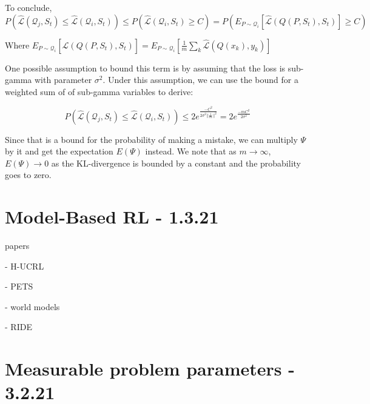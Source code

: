 \documentclass[letterpaper]{article}
\theoremstyle{definition}
\begin{document}
To conclude,
$P\left (\hat{\mathcal{L}}(\mathcal{Q}_j, S_t)\leq \hat{\mathcal{L}}(\mathcal{Q}_i, S_t)\right )\leq P\left (\hat{\mathcal{L}}(\mathcal{Q}_i, S_t)\geq C\right ) = P\left ( E_{P\sim \mathcal{Q}_i}\left [ \hat{\mathcal{L}}(Q(P, S_t), S_t) \right ]\geq C\right ) $

Where 
$E_{P\sim \mathcal{Q}_i}\left [ \hat{\mathcal{L}}(Q(P, S_t), S_t) \right ] = E_{P\sim \mathcal{Q}_i}\left [ \frac{1}{m}\sum_k \hat{\mathcal{L}}(Q(x_k), y_k) \right ] $ 

One possible assumption to bound this term is by assuming that the loss is sub-gamma with parameter $\sigma^2$.
Under this assumption, we can use the bound for a weighted sum of of sub-gamma variables to derive:

$$P\left (\hat{\mathcal{L}}(\mathcal{Q}_j, S_t)\leq \hat{\mathcal{L}}(\mathcal{Q}_i, S_t)\right )\leq 2e^{\frac{-C^2}{2\sigma^2||\frac{1}{m}||^2}}=2e^{\frac{-mC^2}{2\sigma^2}} $$

Since that is a bound for the probability of making a mistake, we can multiply $\Psi$ by it and get the expectation $E (\Psi)$ instead. We note that as $m\rightarrow\infty$, $E (\Psi)\rightarrow 0$ as the KL-divergence is bounded by a constant and the probability goes to zero.


\section{Model-Based RL - 1.3.21} \label{sec:mbrl}

papers

\cite{Curi2020} - H-UCRL

\cite{Chua2018} - PETS

\cite{Ha2018} - world models

\cite{Raileanu2020} - RIDE

\section{Measurable problem parameters - 3.2.21} \label{sec:experiments}
\end{document}
